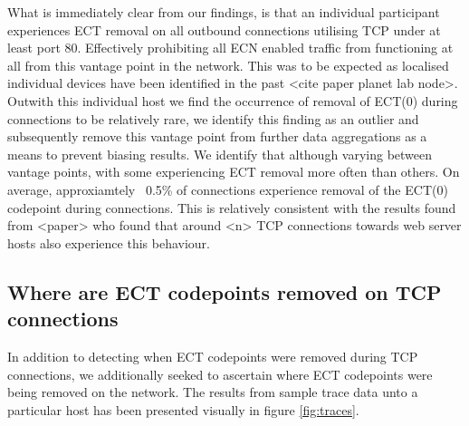 \documentclass{l4proj}
\begin{document}
What is immediately clear from our findings, is that an individual participant experiences ECT removal on all outbound connections utilising TCP under at least port 80. Effectively prohibiting all ECN enabled traffic from functioning at all from this vantage point in the network. This was to be expected as localised individual devices have been identified in the past <cite paper planet lab node>. Outwith this individual host we find the occurrence of removal of ECT(0) during connections to be relatively rare, we identify this finding as an outlier and subsequently remove this vantage point from further data aggregations as a means to prevent biasing results. We identify that although varying between vantage points, with some experiencing ECT removal more often than others. On average, approxiamtely ~0.5\% of connections experience removal of the ECT(0) codepoint during connections. This is relatively consistent with the results found from <paper> who found that around <n> TCP connections towards web server hosts also experience this behaviour.






\subsection{Where are ECT codepoints removed on TCP connections}

In addition to detecting when ECT codepoints were removed during TCP connections, we additionally seeked to ascertain where ECT codepoints were being removed on the network. The results from sample trace data unto a particular host has been presented visually in figure \ref{fig:traces}.
\end{document}
